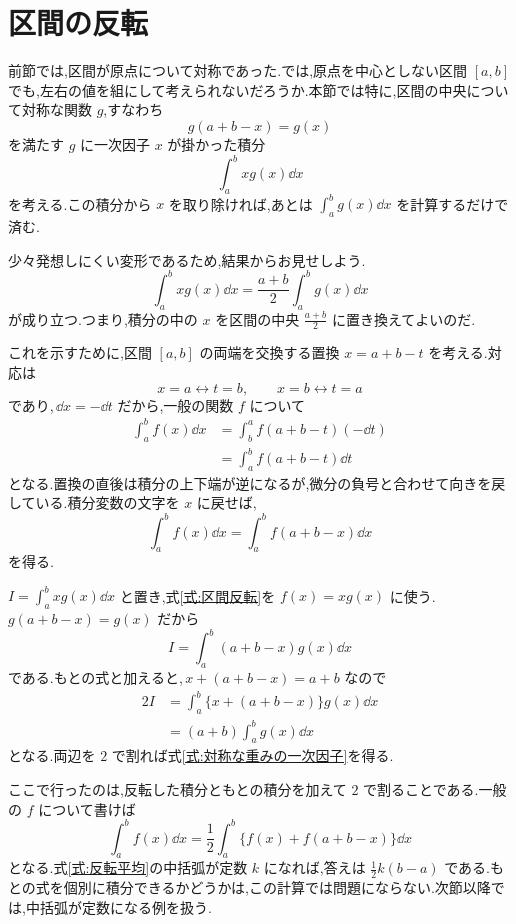 \section{区間の反転}\label{節:区間の反転}

前節では,区間が原点について対称であった.では,原点を中心としない区間 $[a,b]$ でも,左右の値を組にして考えられないだろうか.本節では特に,区間の中央について対称な関数 $g$,すなわち
\[
g(a+b-x)=g(x)
\]
を満たす $g$ に一次因子 $x$ が掛かった積分
\[
\int_a^b xg(x)\dd x
\]
を考える.この積分から $x$ を取り除ければ,あとは $\int_a^b g(x)\dd x$ を計算するだけで済む.

少々発想しにくい変形であるため,結果からお見せしよう.
\begin{equation}\label{式:対称な重みの一次因子}
\int_a^b xg(x)\dd x
 =\frac{a+b}{2}\int_a^b g(x)\dd x
\end{equation}
が成り立つ.つまり,積分の中の $x$ を区間の中央 $\frac{a+b}{2}$ に置き換えてよいのだ.

これを示すために,区間 $[a,b]$ の両端を交換する置換 $x=a+b-t$ を考える.対応は
\[
x=a\longleftrightarrow t=b,\qquad
x=b\longleftrightarrow t=a
\]
であり,\,$\dd x=-\dd t$ だから,一般の関数 $f$ について
\[
\begin{aligned}
\int_a^b f(x)\dd x
 &=\int_b^a f(a+b-t)(-\dd t)\\
 &=\int_a^b f(a+b-t)\dd t
\end{aligned}
\]
となる.置換の直後は積分の上下端が逆になるが,微分の負号と合わせて向きを戻している.積分変数の文字を $x$ に戻せば,
\begin{equation}\label{式:区間反転}
\int_a^b f(x)\dd x=\int_a^b f(a+b-x)\dd x
\end{equation}
を得る.

$I=\int_a^b xg(x)\dd x$ と置き,式\eqref{式:区間反転}を $f(x)=xg(x)$ に使う.\,$g(a+b-x)=g(x)$ だから
\[
I=\int_a^b(a+b-x)g(x)\dd x
\]
である.もとの式と加えると,\,$x+(a+b-x)=a+b$ なので
\[
\begin{aligned}
2I&=\int_a^b\{x+(a+b-x)\}g(x)\dd x\\
 &=(a+b)\int_a^b g(x)\dd x
\end{aligned}
\]
となる.両辺を $2$ で割れば式\eqref{式:対称な重みの一次因子}を得る.

ここで行ったのは,反転した積分ともとの積分を加えて $2$ で割ることである.一般の $f$ について書けば
\begin{equation}\label{式:反転平均}
\int_a^b f(x)\dd x
 =\frac12\int_a^b\{f(x)+f(a+b-x)\}\dd x
\end{equation}
となる.式\eqref{式:反転平均}の中括弧が定数 $k$ になれば,答えは $\frac12k(b-a)$ である.もとの式を個別に積分できるかどうかは,この計算では問題にならない.次節以降では,中括弧が定数になる例を扱う.

